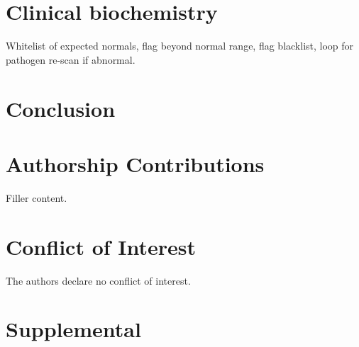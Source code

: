 \documentclass[preprint,11pt,fleqn]{elsarticle}
\begin{document}
\section{Clinical biochemistry}
Whitelist of expected normals, flag beyond normal range, flag blacklist, loop for pathogen re-scan if abnormal.



\section{Conclusion}

\section*{Authorship Contributions}
Filler content.


\section*{Conflict of Interest}
\noindent The authors declare no conflict of interest.

\clearpage


\section*{\refname}
	
%	
	
\pagebreak 


\beginsupplement
\section{Supplemental}
\label{sec:Supplemental_text}

\end{document}
